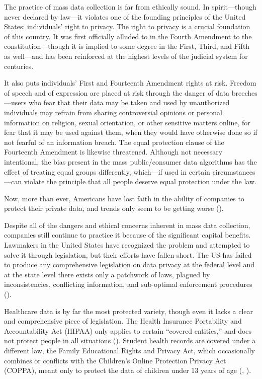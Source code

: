 \documentclass[water,article,submit,moreauthors,pdftex]{mdpi}
\begin{document}
The practice of mass data collection is far from ethically sound. In
spirit---though never declared by law---it violates one of the founding
principles of the United States: individuals' right to privacy. The
right to privacy is a crucial foundation of this country. It was first
officially alluded to in the Fourth Amendment to the
constitution---though it is implied to some degree in the First, Third,
and Fifth as well---and has been reinforced at the highest levels of the
judicial system for centuries.

It also puts individuals' First and Fourteenth Amendment rights at risk.
Freedom of speech and of expression are placed at risk through the
danger of data breeches---users who fear that their data may be taken
and used by unauthorized individuals may refrain from sharing
controversial opinions or personal information on religion, sexual
orientation, or other sensitive matters online, for fear that it may be
used against them, when they would have otherwise done so if not fearful
of an information breach. The equal protection clause of the Fourteenth
Amendment is likewise threatened. Although not necessary intentional,
the bias present in the mass public/consumer data algorithms has the
effect of treating equal groups differently, which---if used in certain
circumstances---can violate the principle that all people deserve equal
protection under the law.

Now, more than ever, Americans have lost faith in the ability of
companies to protect their private data, and trends only seem to be
getting worse (\citet{olmstead2017americans}).

Despite all of the dangers and ethical concerns inherent in mass data
collection, companies still continue to practice it because of the
significant capital benefits. Lawmakers in the United States have
recognized the problem and attempted to solve it through legislation,
but their efforts have fallen short. The US has failed to produce any
comprehensive legislation on data privacy at the federal level and at
the state level there exists only a patchwork of laws, plagued by
inconsistencies, conflicting information, and sub-optimal enforcement
procedures (\citet{cfr-reform}).

Healthcare data is by far the most protected variety, though even it
lacks a clear and comprehensive piece of legislation. The Health
Insurance Portability and Accountability Act (HIPAA) only applies to
certain ``covered entities,'' and does not protect people in all
situations (\citet{hipaa}). Student health records are covered under a
different law, the Family Educational Rights and Privacy Act, which
occasionally combines or conflicts with the Children's Online Protection
Privacy Act (COPPA), meant only to protect the data of children under 13
years of age (\citet{ferpa-coppa}, \citet{cfr-reform}).
\end{document}
